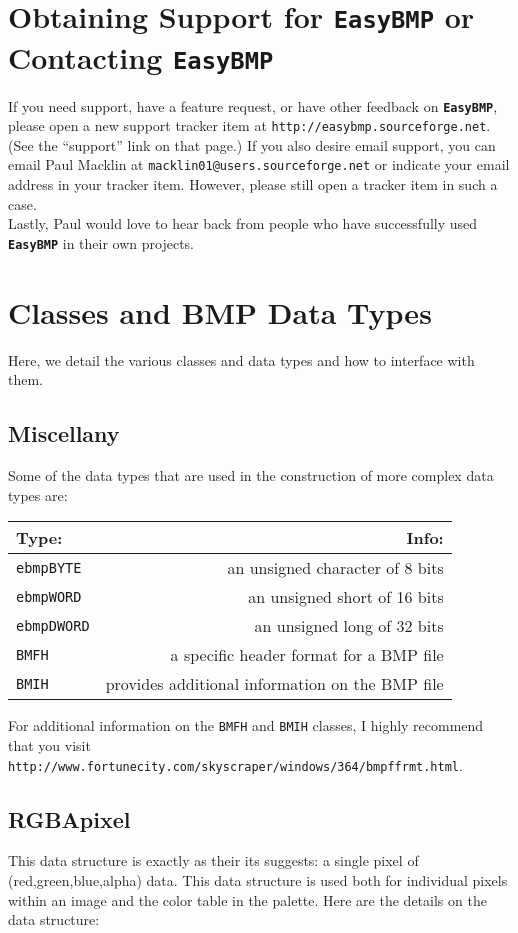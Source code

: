 \documentclass[12pt]{article}
\makeatletter
\newcommand{\EasyBMP}{\textbf{\texttt{{\color{DarkBlue}Easy}{\color{DarkRed}BMP}}}}
\newcommand{\EmailAddress}{\texttt{macklin01@users.sourceforge.net}}
\makeatother
\begin{document}
\section{Obtaining Support for \EasyBMP{} or Contacting \EasyBMP{}}
If you need support, have a feature request, or have other
feedback on \EasyBMP{}, please open a new support tracker item 
at \texttt{http://easybmp.sourceforge.net}. (See the ``support''
link on that page.) If you also desire email support, you can 
email Paul Macklin at \EmailAddress{} or indicate your email 
address in your tracker item. However, please still 
open a tracker item in such a case. \\

Lastly, Paul would love to hear back from people 
who have successfully used \EasyBMP{} in their own projects. 

\appendix

\section{Classes and BMP Data Types}
\label{DataTypeSection}
Here, we detail the various classes and data types and how to interface with them.  
\subsection{Miscellany}
Some of the data types that are used in the construction of more 
complex data types are:
\begin{center}
\begin{tabular}{l | r}
Type: & Info: \\
\hline 
\texttt{ebmpBYTE} & an unsigned character of 8 bits\\
\texttt{ebmpWORD} & an unsigned short of 16 bits\\
\texttt{ebmpDWORD} & an unsigned long of 32 bits\\
\texttt{BMFH} & a specific header format for a BMP file\\
\texttt{BMIH} & provides additional information on the BMP file
\end{tabular}
\end{center}
For additional information on the \texttt{BMFH} and 
\texttt{BMIH} classes, I highly recommend that 
you visit \\

\texttt{http://www.fortunecity.com/skyscraper/windows/364/bmpffrmt.html}.

\subsection{RGBApixel}
This data structure is exactly as their its suggests: a single pixel 
of (red,green,blue,alpha) data. This data structure is used both 
for individual pixels within an image and the color table in the 
palette. Here are the details on the data structure:
\end{document}
